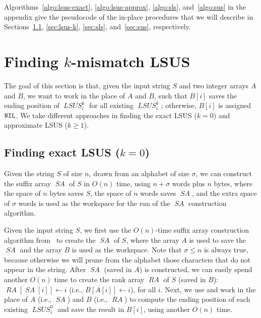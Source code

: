 \documentclass[11pt]{llncs}
\DeclareMathOperator{\lsus}{\mathit{LSUS}}
\DeclareMathOperator{\sa}{\mathit{SA}}
\DeclareMathOperator{\rank}{\mathit{RA}}
\begin{document}
\medskip 

Algorithms~\ref{algo:lsus-exact}, \ref{algo:lsus-approx}, 
\ref{algo:sls}, and~\ref{algo:sus} 
in the appendix give the pseudocode of the
in-place procedures that we will describe in 
Sections~\ref{sec:lsus-0}, \ref{sec:lsus-k},
\ref{sec:sls}, and~\ref{sec:sus}, respectively.


\section{Finding $k$-mismatch LSUS}
\label{sec:lsus} 
The goal of this section is that, given the input string $S$ and two
integer arrays $A$ and $B$, we want to work in the place of $A$ and
$B$, such that $B[i]$ saves the ending position of 
$\lsus_i^k$ for all existing $\lsus_i^k$;
otherwise, $B[i]$ is assigned ${\tt NIL}$.
We take different approaches in finding 
the exact LSUS ($k=0$) and approximate LSUS ($k\geq 1$). 



\subsection{Finding exact LSUS ($k=0$)}
\label{sec:lsus-0}

\begin{lemma}
\label{lem:sa}
Given the string $S$ of size $n$, drawn from an alphabet of
size $\sigma$, we can construct the suffix array $\sa$ of $S$ in
$O(n)$ time, using $n+\sigma$ words plus $n$ bytes, where the space of
$n$ bytes saves $S$, the space of $n$ words saves $\sa$, and the extra
space of $\sigma$ words is used as the workspace for the run of the
$\sa$ construction algorithm.
\end{lemma}

Given the input string $S$, we first use the $O(n)$-time suffix array
construction algorithm from~\cite{Nong-TIS2013} to create the $\sa$ of
$S$, where the array $A$ is used to save the $\sa$ and the array $B$
is used as the workspace. Note that $\sigma \leq n$ is always true,
because otherwise we will prune from the alphabet those characters
that do not appear in the string.
After $\sa$ (saved in $A$) is constructed, we can easily spend
another $O(n)$ time to create the rank array $\rank$ of $S$ (saved in
$B$): $\rank[\sa[i]] \leftarrow i$ (i.e., $B[A[i]] \leftarrow
i$), for all $i$.
Next, we use and work in the place of  $A$ (i.e., $\sa$) and
$B$ (i.e., $\rank$) to compute the ending position of each existing
$\lsus_i^0$ and save the result in $B[i]$, using another $O(n)$
time. 
\end{document}
